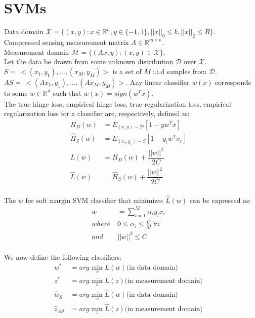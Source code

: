 \documentclass[12pt]{article}
\begin{document}
{\section{SVMs}
Data domain $\mathcal{X} = \{(x, y): x \in \mathbb{R}^n, y \in \{-1, 1\}, ||x||_0 \leq k, ||x||_2 \leq R\}$.\\
Compressed sensing measurement matrix $A \in \mathbb{R}^{m \times n}$.\\
Measurement domain $\mathcal{M} = \{(Ax, y): (x, y) \in \mathcal{X}\}$.\\
Let the data be drawn from some unknown distribution $\mathcal{D}$ over $\mathcal{X}$. $S =\ <(x_1, y_1), ..., (x_M, y_M)>$ is a set of $M$ i.i.d samples from $\mathcal{D}$.\\
$AS =\ <(Ax_1, y_1), ..., (Ax_M, y_M)>$.
Any linear classifier $w(x)$ corresponds to some $w \in \mathbb{R}^n$ such that $w(x) = sign(w^Tx)$.\\
The true hinge loss, empirical hinge loss, true regularization loss, empirical regularization loss for a classifier are, respectively, defined as:
\begin{align*}
    H_D(w) &= E_{(x, y) \sim \mathcal{D}} [1 - yw^Tx]\\
    \hat{H}_S(w) &= E_{(x_i, y_i) \sim S} [1 - y_iw^Tx_i]\\
    L(w) &= H_D(w) + \dfrac{||w||^2}{2C}\\
    \hat{L}(w) &= \hat{H}_S(w) + \dfrac{||w||^2}{2C}\\
\end{align*}

The $w$ for soft margin SVM classifier that minimizes $\hat{L}(w)$ can be expressed as:
\begin{align*}
    w &= \sum_{i = 1}^M \alpha_i y_i x_i\\
    where\ &0 \leq \alpha_i \leq \frac{C}{M}\ \forall i\\
    and\ &||w||^2 \leq C\\
\end{align*}

We now define the following classifiers:
\begin{align*}
    w^* &= arg\min_w L(w) \text{(in data domain)}\\
    z^* &= arg\min_z L(z) \text{(in measurement domain)}\\
    \hat{w}_S &= arg\min_w \hat{L}(w) \text{(in data domain)}\\
    \hat{z}_{AS} &= arg\min_z \hat{L}(z) \text{(in measurement domain)}\\
\end{align*}

}
\end{document}
